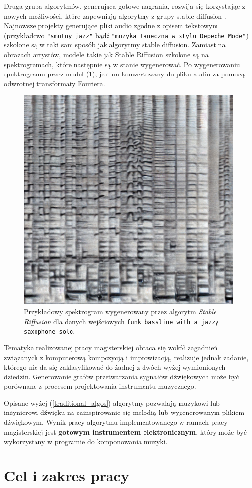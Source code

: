 Druga grupa algorytmów, generująca gotowe nagrania, rozwija się korzystając z nowych możliwości, które zapewniają algorytmy z grupy stable diffusion \cite{stablediffusion}. Najnowsze projekty generujące pliki audio zgodne z opisem tekstowym (przykładowo   \texttt{"smutny jazz"} bądź \texttt{"muzyka taneczna w stylu Depeche Mode"}) szkolone są w taki sam sposób jak algorytmy stable diffusion. Zamiast na obrazach artystów, modele takie jak Stable Riffusion \cite{riffusion} szkolone są na spektrogramach, które następnie są w stanie wygenerować. Po wygenerowaniu spektrogramu przez model (\ref{fig:riffusion_spectro}), jest on konwertowany do pliku audio za pomocą odwrotnej transformaty Fouriera.

\begin{figure}[H]
    \centering
    \includegraphics[width=0.4\linewidth]{rys01/riffusion_spectro.jpg}
    \caption{Przykładowy spektrogram wygenerowany przez algorytm \textit{Stable Riffusion} dla danych wejściowych \texttt{funk bassline with a jazzy saxophone solo}.}
    \label{fig:riffusion_spectro}
\end{figure}




Tematyka realizowanej pracy magisterskiej obraca się wokół zagadnień związanych z komputerową kompozycją i improwizacją, realizuje jednak zadanie, którego nie da się zaklasyfikować do żadnej z dwóch wyżej wymionionych dziedzin. Generowanie grafów przetwarzania
sygnałów dźwiękowych może być porównane z procesem projektowania instrumentu muzycznego.

Opisane wyżej (\ref{traditional_algos}) algorytmy pozwalają muzykowi lub inżynierowi
dźwięku na zainspirowanie się melodią lub wygenerowanym plikiem dźwiękowym.
Wynik pracy algorytmu implementowanego w ramach pracy magisterskiej jest \textbf{gotowym
instrumentem elektronicznym}, który może być wykorzystany w programie do komponowania
muzyki.


\section{Cel i zakres pracy}


